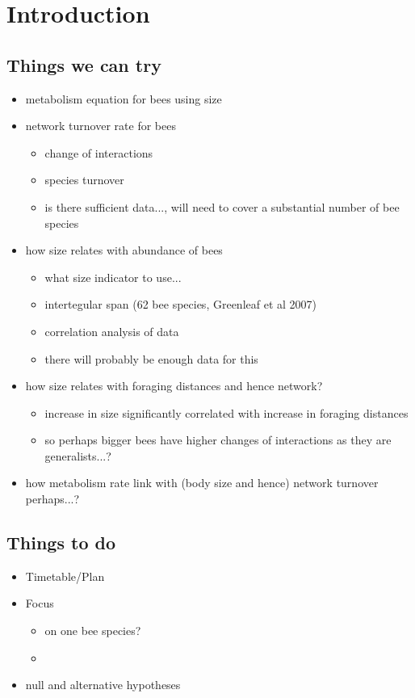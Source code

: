 \documentclass[12pt]{article}
\begin{document}
\section{Introduction} 
\subsection{Things we can try}
\begin{itemize}
	\item metabolism equation for bees using size
	\item network turnover rate for bees 
	\begin{itemize}
		\item change of interactions
		\item species turnover 
		\item is there sufficient data..., will need to cover a substantial number of bee species
	\end{itemize}
	\item how size relates with abundance of bees
	\begin{itemize}
		\item what size indicator to use... 
		\item intertegular span (62 bee species, Greenleaf et al 2007)
		\item correlation analysis of data
		\item there will probably be enough data for this
	\end{itemize}
	\item how size relates with foraging distances and hence network?
	\begin{itemize}
		\item increase in size significantly correlated with increase in foraging distances
		\item so perhaps bigger bees have higher changes of interactions as they are generalists...?
	\end{itemize}
	\item how metabolism rate link with (body size and hence) network turnover perhaps...?
\end{itemize}

\subsection{Things to do}
\begin{itemize}
	\item Timetable/Plan
	\item Focus
	\begin{itemize}
		\item on one bee species?
		\item 
	\end{itemize}
	\item null and alternative hypotheses
\end{itemize}
\end{document}
